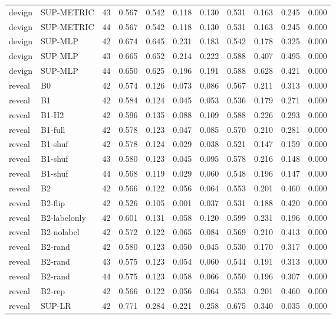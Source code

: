 \begin{tabular}{lllllllllll}
devign & SUP-METRIC & 43 & 0.567 & 0.542 & 0.118 & 0.130 & 0.531 & 0.163 & 0.245 & 0.000 \\
devign & SUP-METRIC & 44 & 0.567 & 0.542 & 0.118 & 0.130 & 0.531 & 0.163 & 0.245 & 0.000 \\
devign & SUP-MLP & 42 & 0.674 & 0.645 & 0.231 & 0.183 & 0.542 & 0.178 & 0.325 & 0.000 \\
devign & SUP-MLP & 43 & 0.665 & 0.652 & 0.214 & 0.222 & 0.588 & 0.407 & 0.495 & 0.000 \\
devign & SUP-MLP & 44 & 0.650 & 0.625 & 0.196 & 0.191 & 0.588 & 0.628 & 0.421 & 0.000 \\
reveal & B0 & 42 & 0.574 & 0.126 & 0.073 & 0.086 & 0.567 & 0.211 & 0.313 & 0.000 \\
reveal & B1 & 42 & 0.584 & 0.124 & 0.045 & 0.053 & 0.536 & 0.179 & 0.271 & 0.000 \\
reveal & B1-H2 & 42 & 0.596 & 0.135 & 0.088 & 0.109 & 0.588 & 0.226 & 0.293 & 0.000 \\
reveal & B1-full & 42 & 0.578 & 0.123 & 0.047 & 0.085 & 0.570 & 0.210 & 0.281 & 0.000 \\
reveal & B1-shuf & 42 & 0.578 & 0.124 & 0.029 & 0.038 & 0.521 & 0.147 & 0.159 & 0.000 \\
reveal & B1-shuf & 43 & 0.580 & 0.123 & 0.045 & 0.095 & 0.578 & 0.216 & 0.148 & 0.000 \\
reveal & B1-shuf & 44 & 0.568 & 0.119 & 0.029 & 0.060 & 0.548 & 0.196 & 0.147 & 0.000 \\
reveal & B2 & 42 & 0.566 & 0.122 & 0.056 & 0.064 & 0.553 & 0.201 & 0.460 & 0.000 \\
reveal & B2-flip & 42 & 0.526 & 0.105 & 0.001 & 0.037 & 0.531 & 0.188 & 0.420 & 0.000 \\
reveal & B2-labelonly & 42 & 0.601 & 0.131 & 0.058 & 0.120 & 0.599 & 0.231 & 0.196 & 0.000 \\
reveal & B2-nolabel & 42 & 0.572 & 0.122 & 0.065 & 0.084 & 0.569 & 0.210 & 0.413 & 0.000 \\
reveal & B2-rand & 42 & 0.580 & 0.123 & 0.050 & 0.045 & 0.530 & 0.170 & 0.317 & 0.000 \\
reveal & B2-rand & 43 & 0.575 & 0.123 & 0.054 & 0.060 & 0.544 & 0.191 & 0.313 & 0.000 \\
reveal & B2-rand & 44 & 0.575 & 0.123 & 0.058 & 0.066 & 0.550 & 0.196 & 0.307 & 0.000 \\
reveal & B2-rep & 42 & 0.566 & 0.122 & 0.056 & 0.064 & 0.553 & 0.201 & 0.460 & 0.000 \\
reveal & SUP-LR & 42 & 0.771 & 0.284 & 0.221 & 0.258 & 0.675 & 0.340 & 0.035 & 0.000 \\

\end{tabular}
